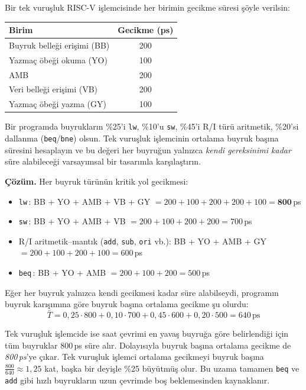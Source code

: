 \begin{ornek}
Bir tek vuruşluk RISC-V işlemcisinde her birimin gecikme süresi şöyle verilsin:
\begin{center}
\small
\begin{tabular}{lc}
\toprule
\textbf{Birim} & \textbf{Gecikme (ps)} \\
\midrule
Buyruk belleği erişimi (BB)   & 200 \\
Yazmaç öbeği okuma (YO)       & 100 \\
AMB                            & 200 \\
Veri belleği erişimi (VB)     & 200 \\
Yazmaç öbeği yazma (GY)       & 100 \\
\bottomrule
\end{tabular}
\end{center}
Bir programda buyrukların \%25'i \texttt{lw}, \%10'u \texttt{sw}, \%45'i R/I türü aritmetik, \%20'si dallanma (\texttt{beq}/\texttt{bne}) olsun. Tek vuruşluk işlemcinin ortalama buyruk başına süresini hesaplayın ve bu değeri her buyruğun yalnızca \emph{kendi gereksinimi kadar} süre alabileceği varsayımsal bir tasarımla karşılaştırın.

\textbf{Çözüm.} Her buyruk türünün kritik yol gecikmesi:
\begin{itemize}[nosep]
    \item \texttt{lw}\,: BB + YO + AMB + VB + GY $= 200 + 100 + 200 + 200 + 100 = \mathbf{800}$\,ps
    \item \texttt{sw}\,: BB + YO + AMB + VB $= 200 + 100 + 200 + 200 = 700$\,ps
    \item R/I aritmetik--mantık (\texttt{add}, \texttt{sub}, \texttt{ori} vb.): BB + YO + AMB + GY $= 200 + 100 + 200 + 100 = 600$\,ps
    \item \texttt{beq}\,: BB + YO + AMB $= 200 + 100 + 200 = 500$\,ps
\end{itemize}

Eğer her buyruk yalnızca kendi gecikmesi kadar süre alabilseydi, programın buyruk karışımına göre buyruk başına ortalama gecikme şu olurdu:
\[
\bar{T} = 0{,}25 \cdot 800 + 0{,}10 \cdot 700 + 0{,}45 \cdot 600 + 0{,}20 \cdot 500 = 640\,\text{ps}
\]

Tek vuruşluk işlemcide ise saat çevrimi en yavaş buyruğa göre belirlendiği için tüm buyruklar 800\,ps süre alır. Dolayısıyla buyruk başına ortalama gecikme de \emph{800\,ps}'ye çıkar. Tek vuruşluk işlemci ortalama gecikmeyi buyruk başına $\frac{800}{640} \approx 1{,}25$ kat, başka bir deyişle \%25 büyütmüş olur. Bu uzama tamamen \texttt{beq} ve \texttt{add} gibi hızlı buyrukların uzun çevrimde boş beklemesinden kaynaklanır.


\end{ornek}
